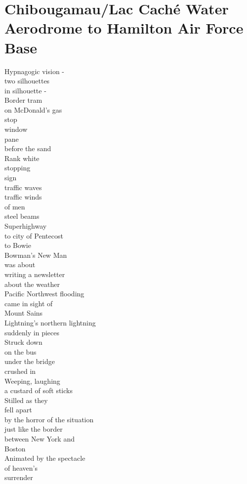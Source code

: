 \documentclass[smalldemyvopaper,11pt,twoside,onecolumn,openright,extrafontsizes]{memoir}
\begin{document}
\chapter{Chibougamau/Lac Caché Water Aerodrome to Hamilton Air Force Base}
Hypnagogic vision -
\\two silhouettes
\\in silhouette -
\\Border tram
\\on McDonald's gas
\\stop
\\window
\\pane
\\before the sand
\\Rank white
\\stopping
\\sign
\\traffic waves
\\traffic winds
\\of men
\\steel beams
\\Superhighway
\\to city of Pentecost
\\to Bowie
\\Bowman's New Man
\\was about
\\writing a newsletter
\\about the weather
\\Pacific Northwest flooding
\\came in sight of
\\Mount Sains
\\Lightning's northern lightning
\\suddenly in pieces
\\Struck down
\\on the bus
\\under the bridge
\\crushed in
\\Weeping, laughing
\\a custard of soft sticks
\\Stilled as they
\\fell apart
\\by the horror of the situation
\\just like the border
\\between New York and
\\Boston
\\Animated by the spectacle
\\of heaven's
\\surrender
\end{document}
